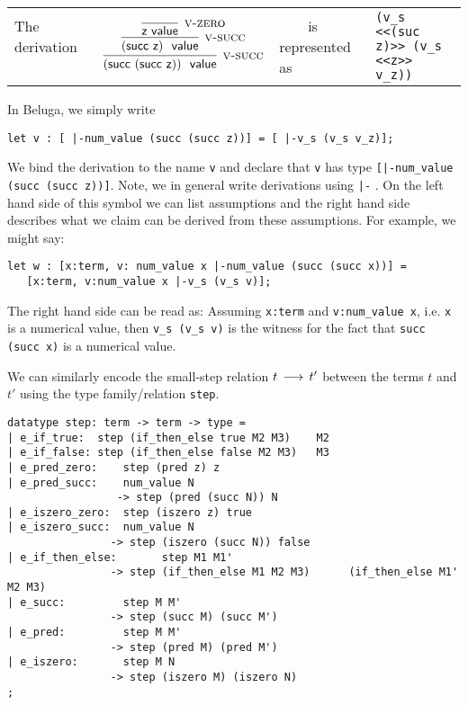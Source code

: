 \begin{tabular}{llll}
The derivation ~~~~&
$
\infer[\Vsuc]{(\tmsucc (\tmsucc \tmzero))~\isv}
{\infer[\Vsuc]{(\tmsucc \tmzero)~\isv}{
 \infer[\Vzero]{\tmzero \isv}{}
 }
}
$
& ~~~~is represented as &  \lstinline!(v_s <<(suc z)>> (v_s <<z>> v_z))!\\[1em]
\end{tabular}

In Beluga, we simply write

\begin{lstlisting}
let v : [ |-num_value (succ (succ z))] = [ |-v_s (v_s v_z)];
\end{lstlisting}

We bind the derivation to the name \lstinline!v! and declare that \lstinline!v!
has type \lstinline![|-num_value (succ (succ z))]!. Note, we in general write
derivations using \lstinline!|-! . On the left hand side of this symbol we can
list assumptions and the right hand side describes what we claim can be derived
from these assumptions.  For example, we might say:

\begin{lstlisting}
let w : [x:term, v: num_value x |-num_value (succ (succ x))] =
   [x:term, v:num_value x |-v_s (v_s v)];
\end{lstlisting}

The right hand side can be read as: Assuming \lstinline!x:term! and
\lstinline!v:num_value x!, i.e. \lstinline!x! is a numerical value, then
\lstinline!v_s (v_s v)! is the witness for the fact that
\lstinline!succ (succ x)! is a numerical value.


We can similarly encode the small-step relation $t \mathrel{\,\longrightarrow\,} t'$ between the terms
$t$ and $t'$ using the type family/relation \lstinline!step!.

\begin{lstlisting}
datatype step: term -> term -> type =
| e_if_true:  step (if_then_else true M2 M3)    M2
| e_if_false: step (if_then_else false M2 M3)   M3
| e_pred_zero:    step (pred z) z
| e_pred_succ:    num_value N
                 -> step (pred (succ N)) N
| e_iszero_zero:  step (iszero z) true
| e_iszero_succ:  num_value N
                -> step (iszero (succ N)) false
| e_if_then_else:       step M1 M1'
                -> step (if_then_else M1 M2 M3)      (if_then_else M1' M2 M3)
| e_succ:         step M M'
                -> step (succ M) (succ M')
| e_pred:         step M M'
                -> step (pred M) (pred M')
| e_iszero:       step M N
                -> step (iszero M) (iszero N)
;
\end{lstlisting}


